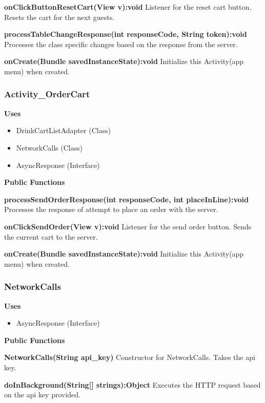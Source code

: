 \documentclass [10pt]{article}
\begin{document}
\textbf{onClickButtonResetCart(View v):void}
Listener for the reset cart button. Resets the cart for the next guests.

\textbf{processTableChangeResponse(int responseCode, String token):void}
Processes the class specific changes based on the response from the server.

\textbf{onCreate(Bundle savedInstanceState):void}
Initialize this Activity(app menu) when created.


\subsubsection{Activity\_OrderCart}

\textbf{Uses}
\begin{itemize}
	\item DrinkCartListAdapter (Class)
	\item NetworkCalls (Class)
	\item AsyncResponse (Interface)
\end{itemize}

\textbf{Public Functions}

\textbf{processSendOrderResponse(int responseCode, int placeInLine):void}
Processes the response of attempt to place an order with the server.

\textbf{onClickSendOrder(View v):void}
Listener for the send order button. Sends the current cart to the server.

\textbf{onCreate(Bundle savedInstanceState):void}
Initialize this Activity(app menu) when created.


\subsubsection{NetworkCalls}

\textbf{Uses}
\begin{itemize}
	\item AsyncResponse (Interface)
\end{itemize}


\textbf{Public Functions}

\textbf{NetworkCalls(String api\_key)}
Constructor for NetworkCalls. Takes the api key.

\textbf{doInBackground(String[] strings):Object}
Executes the HTTP request based on the api key provided.
\end{document}
